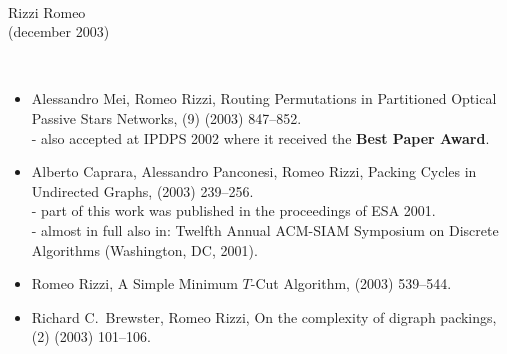 \documentclass[10pt]{article}
\begin{document}
\mbox{\ }
\vspace{-2.8cm} 
\begin{center}
{\Huge {}
               Rizzi Romeo}\\ \vspace{4mm}
               (december 2003)
\end{center}

\mbox{\ }
\vspace{-0.4cm}


\begin{itemize}
\vspace{-3.0mm}
  \vspace{1.4mm}
  \item {\sc Alessandro Mei, Romeo Rizzi},
   \newblock  Routing Permutations in Partitioned Optical Passive Stars Networks,
    (9) (2003) 847--852.
   \newblock \\ - also accepted at IPDPS 2002 where it received the {\bf Best Paper Award}.

  \vspace{1.4mm}
  \item {\sc Alberto Caprara, Alessandro Panconesi, Romeo Rizzi},
   \newblock  Packing Cycles in Undirected Graphs,
    (2003) 239--256.
   \newblock \\ - part of this work was published in the proceedings of ESA 2001.
   \newblock \\ - almost in full also in: Twelfth Annual ACM-SIAM Symposium on Discrete Algorithms (Washington, DC, 2001).

  \vspace{1.4mm}
  \item {\sc Romeo Rizzi},
   \newblock  A Simple Minimum $T$-Cut Algorithm,
    (2003) 539--544.

  \vspace{1.4mm}
  \item {\sc Richard C.~Brewster, Romeo Rizzi},
   \newblock  On the complexity of digraph packings,
    (2) (2003) 101--106.


\end{itemize}
\end{document}
